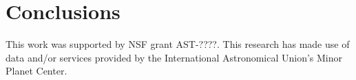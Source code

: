 \documentclass[linenumbers, onecolumn]{aastex631}
\begin{document}
\section{Conclusions}

\begin{acknowledgments}
  This work was supported by NSF grant AST-????.
  This research has made use of data and/or services provided by the International Astronomical Union's Minor Planet Center. 
\end{acknowledgments}

\newpage

%
\end{document}
